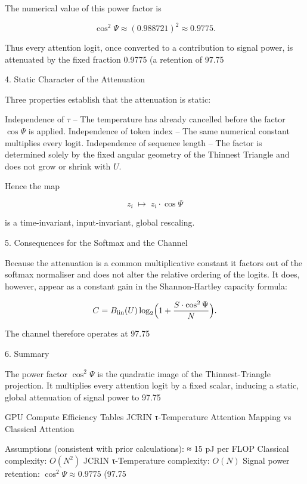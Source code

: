 The numerical value of this power factor is

\[
\cos^2\Psi\approx(0.988721)^2\approx0.9775.
\]

Thus every attention logit, once converted to a contribution to signal power, is attenuated by the fixed fraction 0.9775 (a retention of 97.75 %

4. Static Character of the Attenuation

Three properties establish that the attenuation is static:

Independence of \(\tau\) – The temperature has already cancelled before the factor \(\cos\Psi\) is applied.  
Independence of token index – The same numerical constant multiplies every logit.  
Independence of sequence length – The factor is determined solely by the fixed angular geometry of the Thinnest Triangle and does not grow or shrink with \(U\).

Hence the map

\[
z_i\;\longmapsto\;z_i\cdot\cos\Psi
\]

is a time-invariant, input-invariant, global rescaling.

5. Consequences for the Softmax and the Channel

Because the attenuation is a common multiplicative constant it factors out of the softmax normaliser and does not alter the relative ordering of the logits. It does, however, appear as a constant gain in the Shannon-Hartley capacity formula:

\[
C=B_{\rm lin}(U)\log_2\Bigl(1+\frac{S\cdot\cos^2\Psi}{N}\Bigr).
\]

The channel therefore operates at 97.75 %

6. Summary

The power factor \(\cos^2\Psi\) is the quadratic image of the Thinnest-Triangle projection. It multiplies every attention logit by a fixed scalar, inducing a static, global attenuation of signal power to 97.75 %

GPU Compute Efficiency Tables  
JCRIN τ-Temperature Attention Mapping vs Classical Attention

Assumptions (consistent with prior calculations):
≈ 15 pJ per FLOP
Classical complexity: \( O(N^2) \)
JCRIN τ-Temperature complexity: \( O(N) \)
Signal power retention: \( \cos^2\Psi \approx 0.9775 \) (97.75 %

